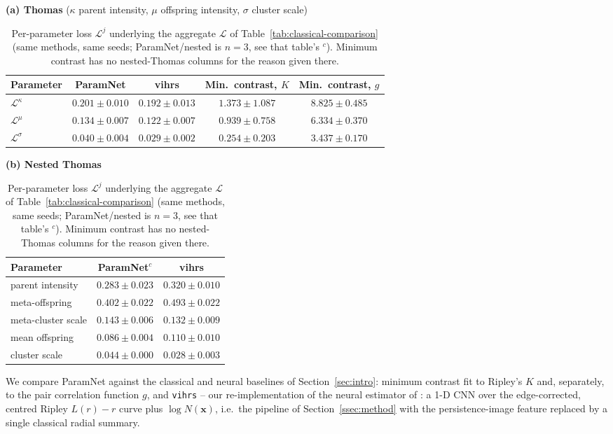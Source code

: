 \documentclass[11pt,a4paper]{article}
\newcommand{\pc}{\mathbf{x}}
\theoremstyle{definitioncolon}
\begin{document}
\begin{table}[tbp]
\centering
\small
\textbf{(a) Thomas} ($\kappa$ parent intensity, $\mu$ offspring intensity, $\sigma$ cluster scale)\\[2pt]
\begin{tabular}{lcccc}
\toprule
Parameter & ParamNet & vihrs & Min.\ contrast, $K$ & Min.\ contrast, $g$ \\
\midrule
$\mathcal{L}^\kappa$ & $0.201 \pm 0.010$ & $0.192 \pm 0.013$ & $1.373 \pm 1.087$ & $8.825 \pm 0.485$ \\
$\mathcal{L}^\mu$    & $0.134 \pm 0.007$ & $0.122 \pm 0.007$ & $0.939 \pm 0.758$ & $6.334 \pm 0.370$ \\
$\mathcal{L}^\sigma$ & $0.040 \pm 0.004$ & $0.029 \pm 0.002$ & $0.254 \pm 0.203$ & $3.437 \pm 0.170$ \\
\bottomrule
\end{tabular}

\vspace{10pt}
\textbf{(b) Nested Thomas}\\[2pt]
\begin{tabular}{lcc}
\toprule
Parameter & ParamNet$^{c}$ & vihrs \\
\midrule
parent intensity      & $0.283 \pm 0.023$ & $0.320 \pm 0.010$ \\
meta-offspring        & $0.402 \pm 0.022$ & $0.493 \pm 0.022$ \\
meta-cluster scale    & $0.143 \pm 0.006$ & $0.132 \pm 0.009$ \\
mean offspring        & $0.086 \pm 0.004$ & $0.110 \pm 0.010$ \\
cluster scale         & $0.044 \pm 0.000$ & $0.028 \pm 0.003$ \\
\bottomrule
\end{tabular}
\caption{Per-parameter loss $\mathcal{L}^j$ underlying the aggregate
$\mathcal{L}$ of Table~\ref{tab:classical-comparison} (same methods, same
seeds; ParamNet/nested is $n{=}3$, see that table's $^{c}$). Minimum
contrast has no nested-Thomas columns for the reason given there.}
\label{tab:perparam}
\end{table}

We compare ParamNet against the classical and neural baselines of
Section~\ref{sec:intro}: minimum contrast fit to
Ripley's $K$ and, separately, to the pair correlation function $g$,
and \texttt{vihrs} -- our re-implementation
of the neural estimator of \citet{vihrs2022neural}: a 1-D CNN over the
edge-corrected, centred Ripley $L(r)-r$ curve
plus $\log N(\pc)$, i.e.\ the pipeline of Section~\ref{ssec:method} with the
persistence-image feature replaced by a single classical radial summary.
\end{document}
